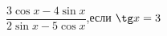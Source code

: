 \begin{ex}[type=calculate_expression]
	\begin{condition}
		\( \dfrac{3\cos x - 4\sin x}{2\sin x - 5\cos x} \),\quad если \( \tg x = 3 \)
	\end{condition}
\end{ex}